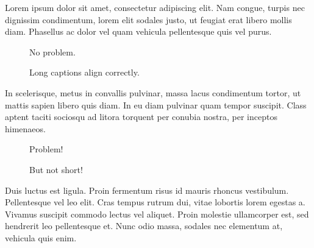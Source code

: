 \documentclass{amsart}
\begin{document}
Lorem ipsum dolor sit amet, consectetur adipiscing elit. Nam congue, turpis nec dignissim condimentum, lorem elit sodales justo, ut feugiat erat libero mollis diam. Phasellus ac dolor vel quam vehicula pellentesque quis vel purus. 

\begin{wrapfigure}{r}{0.5\textwidth}
No problem.
\caption{Long captions align correctly.}
\end{wrapfigure}

In scelerisque, metus in convallis pulvinar, massa lacus condimentum tortor, ut mattis sapien libero quis diam. In eu diam pulvinar quam tempor suscipit. Class aptent taciti sociosqu ad litora torquent per conubia nostra, per inceptos himenaeos.

\begin{wrapfigure}{r}{0.5\textwidth}
Problem!
\caption{But not short!}
\end{wrapfigure}

Duis luctus est ligula. Proin fermentum risus id mauris rhoncus vestibulum. Pellentesque vel leo elit. Cras tempus rutrum dui, vitae lobortis lorem egestas a. Vivamus suscipit commodo lectus vel aliquet. Proin molestie ullamcorper est, sed hendrerit leo pellentesque et. Nunc odio massa, sodales nec elementum at, vehicula quis enim.
\end{document}
